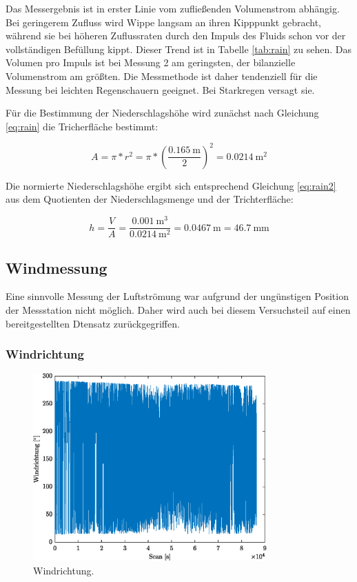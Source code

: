 Das Messergebnis ist in erster Linie vom zufließenden Volumenstrom abhängig. Bei geringerem Zufluss wird Wippe  langsam an ihren Kipppunkt gebracht, während sie bei höheren Zuflussraten durch den Impuls des Fluids schon vor der vollständigen Befüllung kippt. Dieser Trend ist in Tabelle \ref{tab:rain} zu sehen. Das Volumen pro Impuls ist bei Messung 2 am geringsten, der bilanzielle Volumenstrom am größten. Die Messmethode ist daher tendenziell für die Messung bei leichten Regenschauern geeignet. Bei Starkregen versagt sie.

Für die Bestimmung der Niederschlagshöhe wird zunächst nach Gleichung \ref{eq:rain} die Tricherfläche bestimmt:

\begin{equation}
	\label{eq:rain}
	A= \pi * r^2= \pi * (\frac{\SI{0,165}{\meter}}{2})^2 = \SI{0,0214}{\square\meter}
\end{equation}

Die normierte Niederschlagshöhe ergibt sich entsprechend Gleichung \ref{eq:rain2} aus dem Quotienten der Niederschlagsmenge und der Trichterfläche:

\begin{equation}
	\label{eq:rain2}
	h = \frac{V}{A} = \frac{\SI{0,001}{\cubic\meter}}{\SI{0,0214}{\square\meter}} = \SI{0,0467}{\meter} = \SI{46,7}{\milli\meter}
\end{equation}

\subsection{Windmessung}
Eine sinnvolle Messung der Luftströmung war aufgrund der ungünstigen Position der Messstation nicht möglich. Daher wird auch bei diesem Versuchsteil auf einen bereitgestellten Dtensatz zurückgegriffen.

\subsubsection{Windrichtung}

\begin{figure}[H]
	\centering
	\includegraphics[width=0.8\textwidth]{../DATA/Windrichtung.eps}
	\caption[Windrichtung]{Windrichtung.}
	\label{fig:winddir}
\end{figure}

